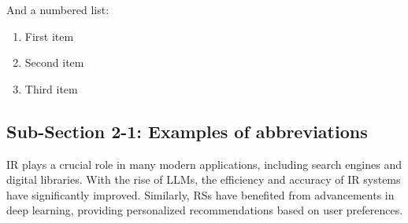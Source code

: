 And a numbered list:

\begin{enumerate}
    \item First item
    \item Second item
    \item Third item
\end{enumerate}

\blindtext


\subsection{Sub-Section 2-1: Examples of abbreviations}

\Gls{IR} plays a crucial role in many modern applications, including search engines and digital libraries. With the rise of \glspl{LLM}, the efficiency and accuracy of \gls{IR} systems have significantly improved. Similarly, \glspl{RS} have benefited from advancements in deep learning, providing personalized recommendations based on user preferences.

\blindtext
